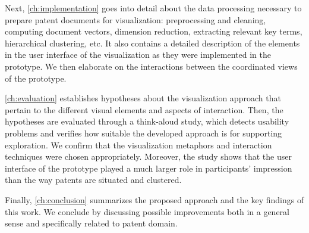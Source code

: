 Next, \autoref{ch:implementation} goes into detail about the data processing necessary to prepare patent documents for visualization: preprocessing and cleaning, computing document vectors, dimension reduction, extracting relevant key terms, hierarchical clustering, etc.
It also contains a detailed description of the elements in the user interface of the visualization as they were implemented in the prototype.
We then elaborate on the interactions between the coordinated views of the prototype.

\autoref{ch:evaluation} establishes hypotheses about the visualization approach that pertain to the different visual elements and aspects of interaction.
Then, the hypotheses are evaluated through a think-aloud study, which detects usability problems and verifies how suitable the developed approach is for supporting exploration.
We confirm that the visualization metaphors and interaction techniques were chosen appropriately.
Moreover, the study shows that the user interface of the prototype played a much larger role in participants' impression than the way patents are situated and clustered.

Finally, \autoref{ch:conclusion} summarizes the proposed approach and the key findings of this work.
We conclude by discussing possible improvements both in a general sense and specifically related to patent domain.